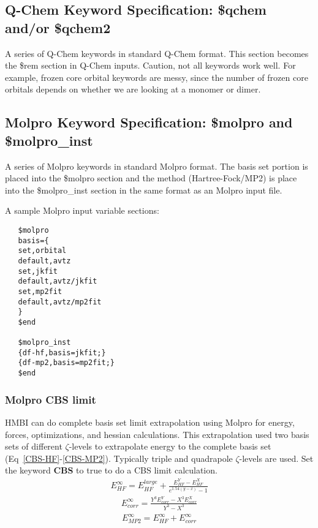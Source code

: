 \documentclass[11pt,letterpaper]{article}
\begin{document}
\begin{spacing}{1.0}
\subsection{Q-Chem Keyword Specification: \$qchem and/or \$qchem2} 
	A series of Q-Chem keywords in standard Q-Chem format. This
	section becomes the \$rem section in Q-Chem inputs.   Caution,
        not all keywords work well.  For example, frozen core orbital
        keywords are messy, since the number of frozen core orbitals
        depends on whether we are looking at a monomer or dimer.

\subsection{Molpro Keyword Specification: \$molpro and \$molpro\_inst} 

A series of Molpro keywords in standard Molpro format. The basis set 
 portion is placed into the \$molpro section and the method (Hartree-Fock/MP2) is place 
into the \$molpro\_inst section in the same format as an Molpro input file.


A sample Molpro input variable sections:

\begin{verbatim}
   $molpro
   basis={
   set,orbital
   default,avtz
   set,jkfit
   default,avtz/jkfit
   set,mp2fit
   default,avtz/mp2fit
   }
   $end

   $molpro_inst
   {df-hf,basis=jkfit;}
   {df-mp2,basis=mp2fit;}
   $end
\end{verbatim}

\subsubsection{Molpro CBS limit}

HMBI can do complete basis set limit extrapolation using Molpro for energy, forces, optimizations, and hessian calculations.
 This extrapolation used two basis sets of different $\zeta$-levels to extrapolate energy to the complete basis set (Eq~\ref{CBS-HF}-\ref{CBS-MP2}).
Typically triple and quadrapole $\zeta$-levels are used.  Set the keyword {\bf CBS} to true to do a CBS limit calculation.
\begin{eqnarray}
\label{CBS-HF}
E_{HF}^{\infty} = E_{HF}^{large}+ \frac{E_{HF}^{Y}-E_{HF}^{X}}{e^{1.54(y-x)}-1} 
\end{eqnarray}
\begin{eqnarray}
\label{CBS-Coor}
E_{corr}^{\infty} = \frac{Y^3E_{corr}^{Y}-X^3E_{corr}^{X}}{Y^3-X^3}
\end{eqnarray}
\begin{eqnarray}
\label{CBS-MP2}
E_{MP2}^{\infty} = E_{HF}^{\infty} + E_{corr}^{\infty} 
\end{eqnarray}


\end{spacing}
\end{document}
